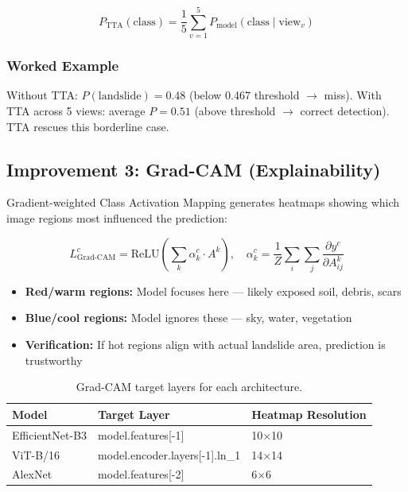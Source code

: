 \documentclass[11pt]{article}
\begin{document}
\[
P_{\text{TTA}}(\text{class}) = \frac{1}{5} \sum_{v=1}^{5} P_{\text{model}}(\text{class} \mid \text{view}_v)
\]

\subsubsection{Worked Example}

Without TTA: $P(\text{landslide}) = 0.48$ (below 0.467 threshold $\to$ miss). With TTA across 5 views: average $P = 0.51$ (above threshold $\to$ correct detection). TTA rescues this borderline case.

\subsection{Improvement 3: Grad-CAM (Explainability)}

Gradient-weighted Class Activation Mapping generates heatmaps showing which image regions most influenced the prediction:

\[
L_{\text{Grad-CAM}}^{c} = \text{ReLU}\!\left(\sum_k \alpha_k^c \cdot A^k\right), \quad \alpha_k^c = \frac{1}{Z} \sum_i \sum_j \frac{\partial y^c}{\partial A^k_{ij}}
\]

\begin{itemize}[noitemsep]
    \item \textbf{Red/warm regions:} Model focuses here --- likely exposed soil, debris, scars
    \item \textbf{Blue/cool regions:} Model ignores these --- sky, water, vegetation
    \item \textbf{Verification:} If hot regions align with actual landslide area, prediction is trustworthy
\end{itemize}

\begin{table}[H]
    \centering
    \begin{tabular}{lll}
        \toprule
        \textbf{Model} & \textbf{Target Layer} & \textbf{Heatmap Resolution} \\
        \midrule
        EfficientNet-B3 & model.features[-1] & 10$\times$10 \\
        ViT-B/16 & model.encoder.layers[-1].ln\_1 & 14$\times$14 \\
        AlexNet & model.features[-2] & 6$\times$6 \\
        \bottomrule
    \end{tabular}
    \caption{Grad-CAM target layers for each architecture.}
\end{table}
\end{document}
